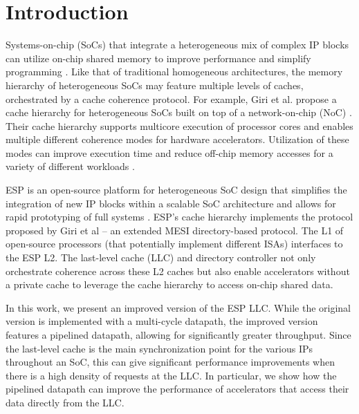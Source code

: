\section{Introduction}
\label{sec:intro}

Systems-on-chip (SoCs) that integrate a heterogeneous mix of complex IP blocks
can utilize on-chip shared memory to improve performance and simplify
programming \cite{spandex, cohort, li2023duet, mantovani_cases16}.  Like that
of traditional homogeneous architectures, the memory hierarchy of heterogeneous
SoCs may feature multiple levels of caches, orchestrated by a cache coherence
protocol. For example, Giri et al. propose a cache hierarchy for heterogeneous
SoCs built on top of a network-on-chip (NoC) \cite{giri18}.  Their cache
hierarchy supports multicore execution of processor cores and enables multiple
different coherence modes for hardware accelerators.  Utilization of these
modes can improve execution time and reduce off-chip memory accesses for a
variety of different workloads \cite{giri_ieeemicro18, zuckerman_micro21}.

\par ESP is an open-source platform for heterogeneous SoC design that simplifies
the integration of new IP blocks within a scalable SoC architecture and allows
for rapid prototyping of full systems \cite{mantovani_iccad20}. ESP's cache
hierarchy implements the protocol proposed by Giri et al -- an extended MESI
directory-based protocol.  The L1 of open-source processors (that potentially
implement different ISAs) interfaces to the ESP L2. The last-level cache (LLC)
and directory controller not only orchestrate coherence across these L2 caches
but also enable accelerators without a private cache to leverage the cache
hierarchy to access on-chip shared data.

\par In this work, we present an improved version of the ESP LLC. While the
original version is implemented with a multi-cycle datapath, the improved
version features a pipelined datapath, allowing for significantly greater
throughput. Since the last-level cache is the main synchronization point for
the various IPs throughout an SoC, this can give significant performance
improvements when there is a high density of requests at the LLC. In
particular, we show how the pipelined datapath can improve the performance of
accelerators that access their data directly from the LLC.
